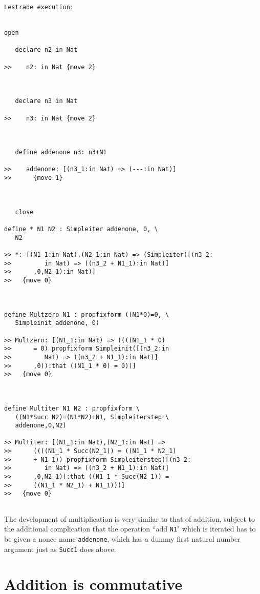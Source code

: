 \documentclass[12pt]{article}
\begin{document}
\begin{verbatim}Lestrade execution:


open

   declare n2 in Nat

>>    n2: in Nat {move 2}



   declare n3 in Nat

>>    n3: in Nat {move 2}



   define addenone n3: n3+N1

>>    addenone: [(n3_1:in Nat) => (---:in Nat)]
>>      {move 1}



   close

define * N1 N2 : Simpleiter addenone, 0, \
   N2

>> *: [(N1_1:in Nat),(N2_1:in Nat) => (Simpleiter([(n3_2:
>>         in Nat) => ((n3_2 + N1_1):in Nat)]
>>      ,0,N2_1):in Nat)]
>>   {move 0}



define Multzero N1 : propfixform ((N1*0)=0, \
   Simpleinit addenone, 0)

>> Multzero: [(N1_1:in Nat) => ((((N1_1 * 0)
>>      = 0) propfixform Simpleinit([(n3_2:in
>>         Nat) => ((n3_2 + N1_1):in Nat)]
>>      ,0)):that ((N1_1 * 0) = 0))]
>>   {move 0}



define Multiter N1 N2 : propfixform \
   ((N1*Succ N2)=(N1*N2)+N1, Simpleiterstep \
   addenone,0,N2)

>> Multiter: [(N1_1:in Nat),(N2_1:in Nat) =>
>>      ((((N1_1 * Succ(N2_1)) = ((N1_1 * N2_1)
>>      + N1_1)) propfixform Simpleiterstep([(n3_2:
>>         in Nat) => ((n3_2 + N1_1):in Nat)]
>>      ,0,N2_1)):that ((N1_1 * Succ(N2_1)) =
>>      ((N1_1 * N2_1) + N1_1)))]
>>   {move 0}


\end{verbatim}

The development of multiplication is very similar to that of addition, subject to the additional complication that the operation ``add {\tt N1}" which is iterated has to be given
a nonce name {\tt addenone}, which has a dummy first natural number argument just as {\tt Succ1} does above.

\section{Addition is commutative}
\end{document}
